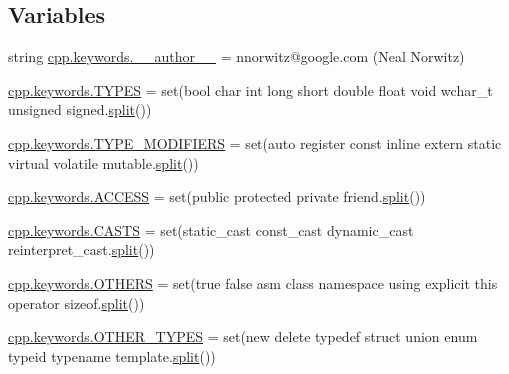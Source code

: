 \subsection*{Variables}
\begin{DoxyCompactItemize}
\item 
string \mbox{\hyperlink{namespacecpp_1_1keywords_a9fc334775aca87951ebdcd556dac21cc}{cpp.\+keywords.\+\_\+\+\_\+author\+\_\+\+\_\+}} = \textquotesingle{}nnorwitz@google.\+com (Neal Norwitz)\textquotesingle{}
\item 
\mbox{\hyperlink{namespacecpp_1_1keywords_a56fd5baf357970548e1ec366edfc2c13}{cpp.\+keywords.\+T\+Y\+P\+ES}} = set(\textquotesingle{}bool char int long short double float void wchar\+\_\+t unsigned signed\textquotesingle{}.\mbox{\hyperlink{_input_8h_aec2fd8cd9140a1b535dc54a924396f40}{split}}())
\item 
\mbox{\hyperlink{namespacecpp_1_1keywords_af9282ce418d6b4b43dca5ed574caedd7}{cpp.\+keywords.\+T\+Y\+P\+E\+\_\+\+M\+O\+D\+I\+F\+I\+E\+RS}} = set(\textquotesingle{}auto register const inline extern static virtual volatile mutable\textquotesingle{}.\mbox{\hyperlink{_input_8h_aec2fd8cd9140a1b535dc54a924396f40}{split}}())
\item 
\mbox{\hyperlink{namespacecpp_1_1keywords_a786f41bbea982641425c819d10bb2064}{cpp.\+keywords.\+A\+C\+C\+E\+SS}} = set(\textquotesingle{}public protected private friend\textquotesingle{}.\mbox{\hyperlink{_input_8h_aec2fd8cd9140a1b535dc54a924396f40}{split}}())
\item 
\mbox{\hyperlink{namespacecpp_1_1keywords_aeba38dc38e188040f4ec44ba05092e7f}{cpp.\+keywords.\+C\+A\+S\+TS}} = set(\textquotesingle{}static\+\_\+cast const\+\_\+cast dynamic\+\_\+cast reinterpret\+\_\+cast\textquotesingle{}.\mbox{\hyperlink{_input_8h_aec2fd8cd9140a1b535dc54a924396f40}{split}}())
\item 
\mbox{\hyperlink{namespacecpp_1_1keywords_a15fe231fbad145538b73892804898809}{cpp.\+keywords.\+O\+T\+H\+E\+RS}} = set(\textquotesingle{}true false asm class namespace using explicit this operator sizeof\textquotesingle{}.\mbox{\hyperlink{_input_8h_aec2fd8cd9140a1b535dc54a924396f40}{split}}())
\item 
\mbox{\hyperlink{namespacecpp_1_1keywords_aa86a5e35a3ace14022a5ca1b91baf207}{cpp.\+keywords.\+O\+T\+H\+E\+R\+\_\+\+T\+Y\+P\+ES}} = set(\textquotesingle{}new delete typedef struct union enum typeid typename template\textquotesingle{}.\mbox{\hyperlink{_input_8h_aec2fd8cd9140a1b535dc54a924396f40}{split}}())
\item 

\end{DoxyCompactItemize}
